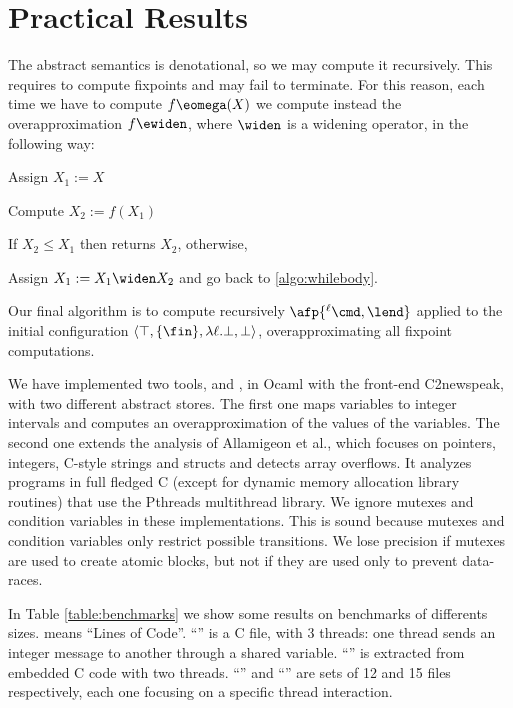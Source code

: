 \documentclass[12pt]{article}
\newcommand{\lab}{  {}^{\ell}}
\newcommand{\fleche}{\mapsto}
\newcommand{\func}[2]{\lambda #1. #2 } \newcommand{\fx}[3]{#1[#2 \fleche #3]} \newcommand{\nf}[3]{#1\smallsetminus[#2 \fleche #3]}  \newcommand{\ndf}[2]{#1(#2)\uparrow}
\begin{document}
\section{Practical Results}\label{algosm}

The abstract semantics is denotational, so we may compute it recursively. This requires to compute fixpoints and may fail to terminate.
For this reason, each time we have to compute \(f\eomega(X)\) we compute instead the overapproximation \(f\ewiden\), where \(\widen\) is a widening operator, in the following way:
 \begin{inparaenum}
 \item Assign \(X_1:=X\)
 \item\label{algo:whilebody} Compute \(X_2:=f(X_1)\)
 \item If \(X_2\leqslant X_1\) then returns \(X_2\), otherwise,
 \item Assign \(X_1:=X_1\widen X_2\) and go back to \ref{algo:whilebody}.
\end{inparaenum} 
Our final algorithm is to compute recursively \(\afp{\lab \cmd,\lend}\) applied to the initial configuration \(\langle \top,\{\fin\},\func{\ell}{\bot},\bot \rangle \), overapproximating all fixpoint computations.

\mytable

We have implemented two tools, \progint{} and \progP{}, in Ocaml with the front-end C2newspeak, with two different abstract stores. 
The first one maps variables to integer intervals and computes an overapproximation of the values of the variables. The second one extends the analysis of Allamigeon et al.\@ \cite{AllamigeonGodardHymansSAS06}, which focuses on pointers, integers, C-style strings and structs and detects array overflows.
It analyzes programs in full fledged C (except for dynamic memory allocation library routines) that use the Pthreads multithread library.
We ignore mutexes and condition variables in these implementations. This is sound because mutexes and condition variables only restrict possible transitions. We lose precision if mutexes are used to create atomic blocks, but not if they are used only to prevent data-races.

In Table \ref{table:benchmarks} we show some results on benchmarks of differents sizes. \loc{} means ``Lines of Code''.
``\messag'' is a C file, with 3 threads: one thread sends an integer message to another through a shared variable. ``\embarque'' is extracted from embedded C code with two threads. ``\douze'' and ``\quinze'' are sets of 12 and 15 files respectively, each one focusing on a specific thread interaction. 
\end{document}
